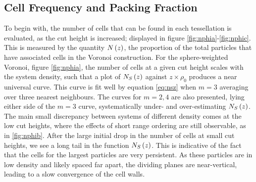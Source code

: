 \subsection{Cell Frequency and Packing Fraction}
\label{s:polycell}

To begin with, the number of cells that can be found in each tessellation is evaluated, as the cut height is increased; displayed in figure \ref{fig:nphia}\--\ref{fig:nphic}.
This is measured by the quantity $N\left(z\right)$, the proportion of the total particles that have associated cells in the Voronoi construction.
For the sphere\--weighted Voronoi, figure \ref{fig:nphia}, the number of cells at a given cut height scales with the system density, such that a plot of $N_S\left(z\right)$ against $z\times \rho_0$ produces a near universal curve.
This curve is fit well by equation \eqref{eq:nsz} when $m=3$ \ie{} averaging over three nearest neighbours.
The curves for $m=2,4$ are also presented, lying either side of the $m=3$ curve, systematically under\-- and over\--estimating $N_S\left(z\right)$.
The main small discrepancy between systems of different density comes at the low cut heights, where the effects of short range ordering are still observable, as in \ref{fig:nphib}.
After the large initial drop in the number of cells at small cut heights, we see a long tail in the function $N_S\left(z\right)$.
This is indicative of the fact that the cells for the largest particles are very persistent.
As these particles are in low density and likely spaced far apart, the dividing planes are near\--vertical, leading to a slow convergence of the cell walls.

